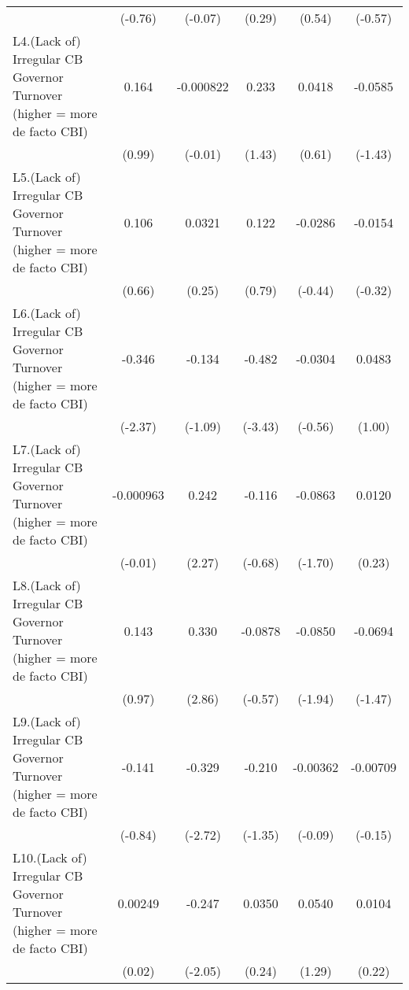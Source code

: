 {\begin{tabular}{l*{5}{c}}
                &  (-0.76)         &  (-0.07)         &   (0.29)         &   (0.54)         &  (-0.57)         \\
[1em]
L4.(Lack of) Irregular CB Governor Turnover (higher = more de facto CBI)&    0.164         &-0.000822         &    0.233         &   0.0418         &  -0.0585         \\
                &   (0.99)         &  (-0.01)         &   (1.43)         &   (0.61)         &  (-1.43)         \\
[1em]
L5.(Lack of) Irregular CB Governor Turnover (higher = more de facto CBI)&    0.106         &   0.0321         &    0.122         &  -0.0286         &  -0.0154         \\
                &   (0.66)         &   (0.25)         &   (0.79)         &  (-0.44)         &  (-0.32)         \\
[1em]
L6.(Lack of) Irregular CB Governor Turnover (higher = more de facto CBI)&   -0.346\sym{*}  &   -0.134         &   -0.482\sym{***}&  -0.0304         &   0.0483         \\
                &  (-2.37)         &  (-1.09)         &  (-3.43)         &  (-0.56)         &   (1.00)         \\
[1em]
L7.(Lack of) Irregular CB Governor Turnover (higher = more de facto CBI)&-0.000963         &    0.242\sym{*}  &   -0.116         &  -0.0863         &   0.0120         \\
                &  (-0.01)         &   (2.27)         &  (-0.68)         &  (-1.70)         &   (0.23)         \\
[1em]
L8.(Lack of) Irregular CB Governor Turnover (higher = more de facto CBI)&    0.143         &    0.330\sym{**} &  -0.0878         &  -0.0850         &  -0.0694         \\
                &   (0.97)         &   (2.86)         &  (-0.57)         &  (-1.94)         &  (-1.47)         \\
[1em]
L9.(Lack of) Irregular CB Governor Turnover (higher = more de facto CBI)&   -0.141         &   -0.329\sym{**} &   -0.210         & -0.00362         & -0.00709         \\
                &  (-0.84)         &  (-2.72)         &  (-1.35)         &  (-0.09)         &  (-0.15)         \\
[1em]
L10.(Lack of) Irregular CB Governor Turnover (higher = more de facto CBI)&  0.00249         &   -0.247\sym{*}  &   0.0350         &   0.0540         &   0.0104         \\
                &   (0.02)         &  (-2.05)         &   (0.24)         &   (1.29)         &   (0.22)         \\

\end{tabular}}
